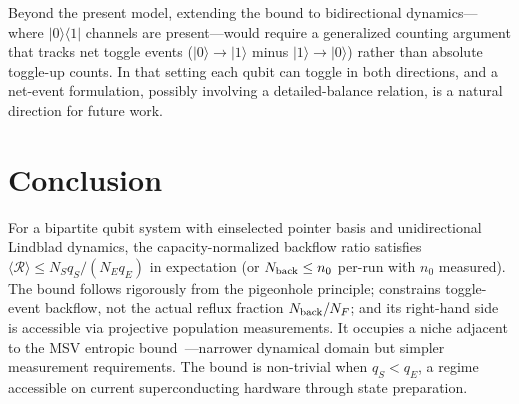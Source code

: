 \documentclass[aps,pra,twocolumn,superscriptaddress,floatfix]{revtex4-2}
\begin{document}
Beyond the present model, extending the bound to bidirectional dynamics---where $|0\rangle\langle 1|$ channels are present---would require a generalized counting argument that tracks net toggle events ($|0\rangle \to |1\rangle$ minus $|1\rangle \to |0\rangle$) rather than absolute toggle-up counts. In that setting each qubit can toggle in both directions, and a net-event formulation, possibly involving a detailed-balance relation, is a natural direction for future work.

\section{Conclusion}

For a bipartite qubit system with einselected pointer basis and unidirectional Lindblad dynamics, the capacity-normalized backflow ratio satisfies $\langle\mathcal{R}\rangle \leq N_S q_S/(N_E q_E)$ in expectation (or $N_{\rm back} \leq n_0$ per-run with $n_0$ measured). The bound follows rigorously from the pigeonhole principle; constrains toggle-event backflow, not the actual reflux fraction $N_{\rm back}/N_F$; and its right-hand side is accessible via projective population measurements. It occupies a niche adjacent to the MSV entropic bound~\cite{Megier:2021}---narrower dynamical domain but simpler measurement requirements. The bound is non-trivial when $q_S < q_E$, a regime accessible on current superconducting hardware through state preparation.
\end{document}

